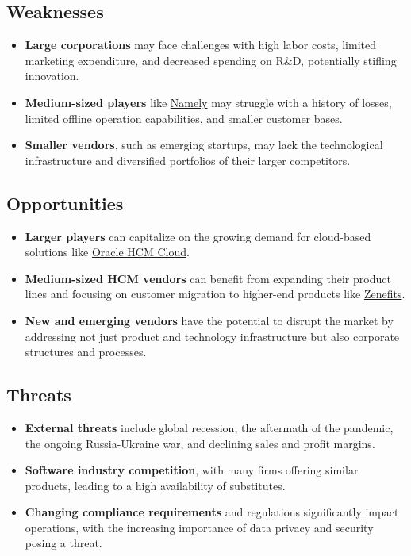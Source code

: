 \documentclass[
  a4paper,
]{book}
\providecommand{\tightlist}{%
  \setlength{\itemsep}{0pt}\setlength{\parskip}{0pt}}\usepackage{longtable,booktabs,array}
\begin{document}
\hypertarget{weaknesses}{%
\subsection{Weaknesses}\label{weaknesses}}

\begin{itemize}
\tightlist
\item
  \textbf{Large corporations} may face challenges with high labor costs,
  limited marketing expenditure, and decreased spending on R\&D,
  potentially stifling innovation.
\item
  \textbf{Medium-sized players} like
  \href{https://www.namely.com/}{Namely} may struggle with a history of
  losses, limited offline operation capabilities, and smaller customer
  bases.
\item
  \textbf{Smaller vendors}, such as emerging startups, may lack the
  technological infrastructure and diversified portfolios of their
  larger competitors.
\end{itemize}

\hypertarget{opportunities}{%
\subsection{Opportunities}\label{opportunities}}

\begin{itemize}
\tightlist
\item
  \textbf{Larger players} can capitalize on the growing demand for
  cloud-based solutions like
  \href{https://www.oracle.com/human-capital-management/cloud/}{Oracle
  HCM Cloud}.
\item
  \textbf{Medium-sized HCM vendors} can benefit from expanding their
  product lines and focusing on customer migration to higher-end
  products like \href{https://www.zenefits.com/}{Zenefits}.
\item
  \textbf{New and emerging vendors} have the potential to disrupt the
  market by addressing not just product and technology infrastructure
  but also corporate structures and processes.
\end{itemize}

\hypertarget{threats}{%
\subsection{Threats}\label{threats}}

\begin{itemize}
\tightlist
\item
  \textbf{External threats} include global recession, the aftermath of
  the pandemic, the ongoing Russia-Ukraine war, and declining sales and
  profit margins.
\item
  \textbf{Software industry competition}, with many firms offering
  similar products, leading to a high availability of substitutes.
\item
  \textbf{Changing compliance requirements} and regulations
  significantly impact operations, with the increasing importance of
  data privacy and security posing a threat.
\end{itemize}
\end{document}
